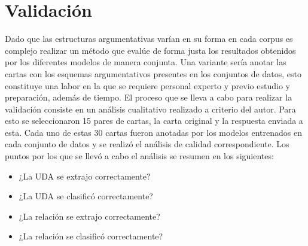 \documentclass[a4paper,11pt,twocolumn,twoside]{article}
\begin{document}
\begin{table}[h]
	\begin{center}
		\caption{\label{table:comparative_test_abstrct_f1_metrics_segmenter}Métricas comparativas de AbsTRCT.}
	\end{center}
\end{table}

\section{Validación}

Dado que las estructuras argumentativas varían en su forma en cada corpus es complejo realizar un método que evalúe de forma 
justa los resultados obtenidos por los diferentes modelos de manera conjunta. Una variante sería anotar las cartas 
con los esquemas argumentativos presentes en los conjuntos de datos, esto constituye una labor en la que se requiere
personal experto y previo estudio y preparación, además de tiempo. El proceso que se lleva a cabo para realizar la 
validación consiste en un análisis cualitativo realizado a criterio del autor. Para esto se seleccionaron 15 pares 
de cartas, la carta original y la respuesta enviada a esta. Cada uno de estas 30 cartas fueron anotadas por los modelos entrenados en cada 
conjunto de datos y se realizó el análisis de calidad correspondiente. Los puntos por los que se llevó a cabo el análisis
se resumen en los siguientes:

\begin{itemize}
	\item ¿La UDA se extrajo correctamente?
	\item ¿La UDA se clasificó correctamente?
	\item ¿La relación se extrajo correctamente?
	\item ¿La relación se clasificó correctamente?
\end{itemize}
\end{document}
